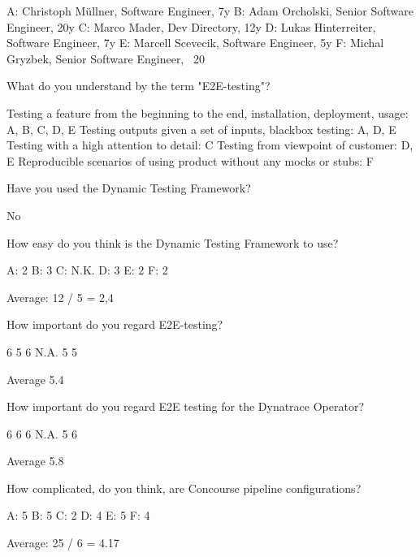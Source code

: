 A: Christoph Müllner, Software Engineer, 7y
B: Adam Orcholski, Senior Software Engineer, 20y
C: Marco Mader, Dev Directory, 12y
D: Lukas Hinterreiter, Software Engineer, 7y
E: Marcell Scevecik, Software Engineer, 5y
F: Michal Gryzbek, Senior Software Engineer, ~20

What do you understand by the term "E2E-testing"?

Testing a feature from the beginning to the end, installation, deployment, usage: A, B, C, D, E
Testing outputs given a set of inputs, blackbox testing: A, D, E
Testing with a high attention to detail: C
Testing from viewpoint of customer: D, E
Reproducible scenarios of using product without any mocks or stubs: F


Have you used the Dynamic Testing Framework?

No


How easy do you think is the Dynamic Testing Framework to use?

A: 2
B: 3
C: N.K.
D: 3
E: 2
F: 2

Average: 12 / 5 = 2,4


How important do you regard E2E-testing?

6
5
6
N.A.
5
5

Average 5.4

How important do you regard E2E testing for the Dynatrace Operator?

6
6
6
N.A.
5
6

Average 5.8

How complicated, do you think, are Concourse pipeline configurations?

A: 5
B: 5
C: 2
D: 4
E: 5
F: 4

Average: 25 / 6 = 4.17

